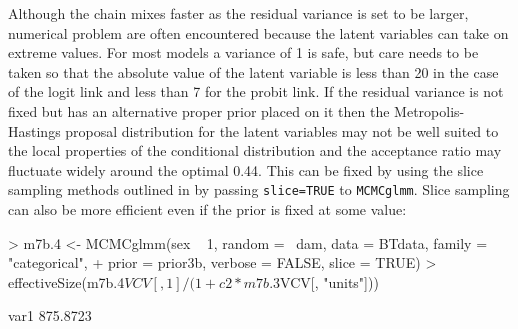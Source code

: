 \documentclass{article}
\begin{document}
Although the chain mixes faster as the residual variance is set to be larger, numerical problem are often encountered because the latent variables can take on extreme values. For most models a variance of 1 is safe, but care needs to be taken so that the absolute value of the latent variable is less than 20 in the case of the logit link and less than 7 for the probit link. If the residual variance is not fixed but has an alternative proper prior placed on it then the Metropolis-Hastings proposal distribution for the latent variables may not be well suited to the local properties of the conditional distribution and the acceptance ratio may fluctuate widely around the optimal 0.44. This can be fixed by using the slice sampling methods outlined in \citet{Damien.1999} by passing \texttt{slice=TRUE} to \texttt{MCMCglmm}. Slice sampling can also be more efficient even if the prior is fixed at some value: 
 
\begin{Schunk}
\begin{Sinput}
> m7b.4 <- MCMCglmm(sex ~ 1, random = ~dam, data = BTdata, family = "categorical", 
+     prior = prior3b, verbose = FALSE, slice = TRUE)
> effectiveSize(m7b.4$VCV[, 1]/(1 + c2 * m7b.3$VCV[, "units"]))
\end{Sinput}
\begin{Soutput}
    var1 
875.8723 
\end{Soutput}
\end{Schunk}

\ifalone
\end{document}
